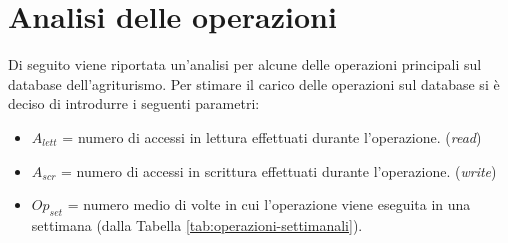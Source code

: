 \documentclass[a4paper,12pt]{report}
\begin{document}
\section{Analisi delle operazioni}
Di seguito viene riportata un'analisi per alcune delle operazioni principali sul database dell'agriturismo.
Per stimare il carico delle operazioni sul database si è deciso di introdurre i seguenti parametri:
\begin{itemize}
	\item $A_{lett}$ = numero di accessi in lettura effettuati durante l'operazione. (\textit{read})
	\item $A_{scr}$ = numero di accessi in scrittura effettuati durante l'operazione. (\textit{write})
	\item $Op_{set}$ = numero medio di volte in cui l'operazione viene eseguita in una settimana (dalla Tabella \ref{tab:operazioni-settimanali}).
\end{itemize}
\end{document}
